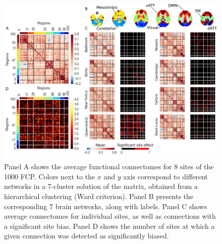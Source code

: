 \documentclass[authoryear]{elsarticle}
\begin{document}
\begin{figure}[htbp]
\begin{center}
\includegraphics[width=\linewidth]{../figures/connectome_multisite.png}
\end{center}
\caption[Connectome variability across sites]{
Panel A shows the average functional connectomes for 8 sites of the 1000 FCP. Colors next to the $x$ and $y$ axis correspond to different networks in a 7-cluster solution of the matrix, obtained from a hierarchical clustering (Ward criterion). Panel B presents the corresponding 7 brain networks, along with labels. Panel C shows average connectomes for individual sites, as well as connections with a significant site bias. Panel D shows the number of sites at which a given connection was detected as significantly biased. 
}
\label{fig_connectome_variability}
\end{figure}
\end{document}
